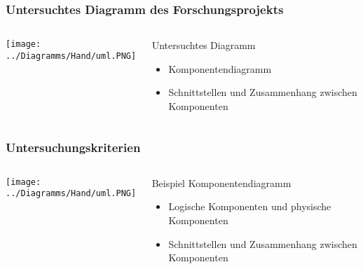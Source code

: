 \documentclass[xcolor=dvipsnames]{beamer}
\begin{document}
	
	
	
	
	\begin{frame}
		\frametitle{Untersuchtes Diagramm des Forschungsprojekts}
		\begin{columns}
			\begin{column}{0.65\textwidth}
				\begin{minipage}{\textwidth}
					\texttt{[image: ../Diagramms/Hand/uml.PNG]}
				\end{minipage}
			\end{column}
			
			\begin{column}{0.35\textwidth}
				\begin{block}{Untersuchtes Diagramm}
					\begin{itemize}
						\item Komponentendiagramm
						\item Schnittstellen und Zusammenhang zwischen Komponenten
					\end{itemize}
					
				\end{block}
			\end{column}
		\end{columns}
	\end{frame}
	
	
	
\begin{frame}
	\frametitle{Untersuchungskriterien}
	\begin{columns}
		\begin{column}{0.70\textwidth}
			\begin{minipage}{\textwidth}
				\texttt{[image: ../Diagramms/Hand/uml.PNG]}
			\end{minipage}
		\end{column}
		
		\begin{column}{0.30\textwidth}
			\begin{block}{Beispiel Komponentendiagramm}
				\begin{itemize}
					\item Logische Komponenten und physische Komponenten 
					\item Schnittstellen und Zusammenhang zwischen Komponenten
				\end{itemize}
				
			\end{block}
		\end{column}
	\end{columns}
\end{frame}
\end{document}
